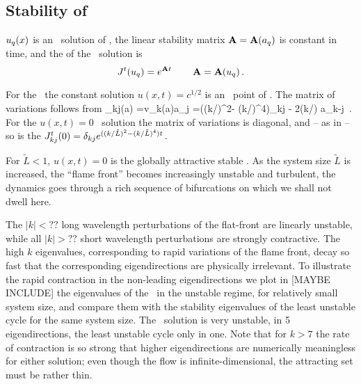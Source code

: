 \subsection{Stability of \eqva}
\label{s:StabEqui}


$u_q(x)$ is an \eqv\ solution of \KSe,
the linear stability matrix
${\bf A}={\bf A}(a_q)$
is constant in time,
and  
the {\jacobianM}
of the \eqv\ solution is
\[
 {J}^t(u_q) = e^{{\bf A} t}
    \,\qquad
 {\bf \ensuremath{A}}={\bf A}(u_q)
\,.
\]

For the \KSe\ the constant solution $u(x,t)= c^{1/2}$ is an 
\eqv\ point of . The matrix of variations
follows from 
\beq
{\Mvar}_{kj}(a) ={\pde v_k(a)\over \pde a_j  }
=((k/)^2- (k/)^4)\delta_{kj} - 2(k/) a_{k-j}
\,.
For the $u(x,t)=0$ \eqv\  solution the matrix of variations
is diagonal, and -- as in  -- so is the {\jacobianM}
$
{J}^t_{kj}(0) = \delta_{kj} e^{((k/\tilde{L})^2- (k/\tilde{L})^4)t}
\,.
$

For $\tilde{L} < 1$,  $u(x,t)=0$ is the globally attractive stable 
{\eqv}.
As the system size $\tilde{L}$  is increased,
the ``flame front'' becomes increasingly unstable and turbulent,
the dynamics goes through a rich sequence of
bifurcations on which we shall not dwell here.

The $|k|<??$ 
long wavelength perturbations of the flat-front {\eqv}
are linearly unstable, while all 
$|k|> ??$ short wavelength perturbations are strongly contractive.  
The high $k$ eigenvalues, corresponding to rapid variations of
the flame front, decay so fast that the corresponding eigendirections
are physically irrelevant.
To illustrate the rapid contraction in the non-leading eigendirections
we plot  in [MAYBE INCLUDE] %
the eigenvalues of the \eqv\ in the unstable regime,
for relatively small system size, %
and compare them with the
stability eigenvalues of the least unstable cycle for the same 
system size.
The \eqv\ solution is very unstable,
in 5 eigendirections,
the least unstable cycle only in one. 
Note that for $k>7$ the rate of contraction
is so strong that higher eigendirections are numerically meaningless for 
either solution; even though the flow is infinite-dimensional, the attracting
set must be rather thin.

